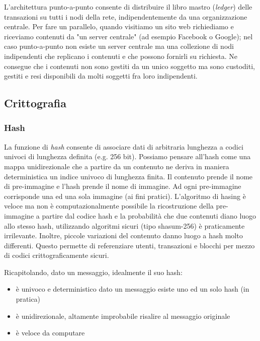 \documentclass{article}
\begin{document}
L'architettura punto-a-punto consente di distribuire il libro mastro (\textit{ledger}) delle transazioni su tutti i nodi della rete,
indipendentemente da una organizzazione centrale. Per fare un parallelo, quando visitiamo un sito web richiediamo e riceviamo
contenuti da "un server centrale" (ad esempio Facebook o Google); nel caso punto-a-punto non esiste un server centrale
ma una collezione di nodi indipendenti che replicano i contenuti e che possono fornirli su richiesta.
Ne consegue che i contenuti non sono gestiti da un unico soggetto  ma sono custoditi, gestiti e resi disponibili da molti soggetti fra loro indipendenti.

\subsection{Crittografia}

\subsubsection{Hash}

La funzione di \textit{hash} consente di associare dati di arbitraria lunghezza a codici univoci di lunghezza definita (e.g. 256 bit).
Possiamo pensare all'hash come una mappa unidirezionale che a partire da un contenuto ne deriva in maniera deterministica un indice univoco di lunghezza finita.
Il contenuto prende il nome di pre-immagine e l'hash prende il nome di immagine. Ad ogni pre-immagine corrisponde una ed una sola immagine (ai fini pratici).
L'algoritmo di hasing è veloce ma non è computazionalmente possibile la ricostruzione della pre-immagine a partire dal codice hash e la probabilità che due
contenuti diano luogo allo stesso hash, utilizzando algoritmi sicuri (tipo shasum-256) è praticamente irrilevante.
Inoltre, piccole variazioni del contenuto danno luogo a hash molto differenti.
Questo permette di referenziare utenti, transazioni e blocchi per mezzo di codici crittograficamente sicuri.

Ricapitolando, dato un messaggio, idealmente il suo hash:

\begin{itemize}
    \item è univoco e deterministico dato un messaggio esiste uno ed un solo hash (in pratica)
    \item è unidirezionale, altamente improbabile risalire al messaggio originale
    \item è veloce da computare
\end{itemize}
\end{document}
